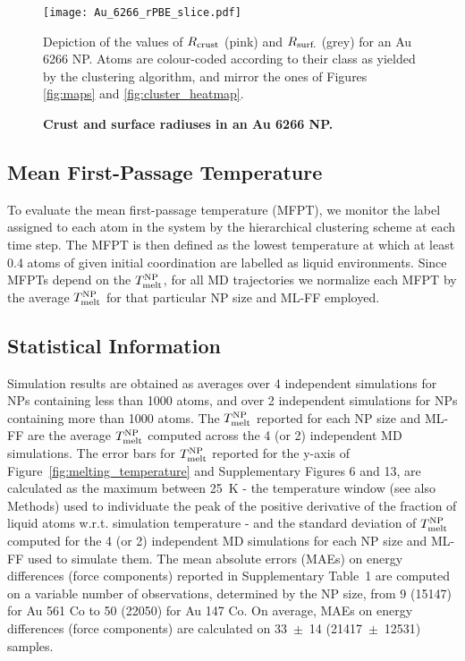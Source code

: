 \documentclass[%
aip,
 amsmath,amssymb,
 reprint,
]{revtex4-1}
\newcommand*\subt[1]{_{\textnormal{#1}}}
\newcommand*\supt[1]{^{\textnormal{#1}}}
\begin{document}
\begin{figure}[t!]
    \centering
    \texttt{[image: Au\_6266\_rPBE\_slice.pdf]}
    \caption{
    \textbf{Crust and surface radiuses in an Au 6266 NP.}}
    Depiction of the values of $R\subt{crust}$ (pink) and $R\subt{surf.}$ (grey) for an Au 6266 NP.
    Atoms are colour-coded according to their class as yielded by the clustering algorithm, and mirror the ones of Figures \ref{fig:maps} and \ref{fig:cluster_heatmap}.
    \label{fig:Au_slice}
\end{figure}



\subsection*{Mean First-Passage Temperature}
\label{subsubsec:mfpt}
%
To evaluate the mean first-passage temperature (MFPT), we monitor the label assigned to each atom in the system by the hierarchical clustering scheme at each time step.
%
The MFPT is then defined as the lowest temperature at which at least 0.4 atoms of given initial coordination are labelled as  liquid environments.
%
Since MFPTs depend on the $T\subt{melt}\supt{NP}$, for all MD trajectories we normalize each MFPT by the average $T\subt{melt}\supt{NP}$ for that particular NP size and ML-FF employed.
%

\subsection*{Statistical Information}
\label{subsec:statistical_info}
%
Simulation results are obtained as averages over 4 independent simulations for NPs containing less than 1000 atoms, and over 2 independent simulations for NPs containing more than 1000 atoms.
%
The $T\subt{melt}\supt{NP}$ reported for each NP size and ML-FF are the average $T\subt{melt}\supt{NP}$ computed across the 4 (or 2) independent MD simulations.
%
The error bars for $T\subt{melt}\supt{NP}$ reported for the y-axis of Figure~\ref{fig:melting_temperature} and Supplementary Figures 6 and 13, are calculated as the maximum between 25~K - the temperature window (see also Methods) used to individuate the peak of the positive derivative of the fraction of liquid atoms w.r.t. simulation temperature - and the standard deviation of $T\subt{melt}\supt{NP}$ computed for the 4 (or 2) independent MD simulations for each NP size and ML-FF used to simulate them.
%
The mean absolute errors (MAEs) on energy differences (force components) reported in Supplementary Table~1 are computed on a variable number of observations, determined by the NP size, from 9 (15147) for Au 561 Co to 50 (22050) for Au 147 Co.
%
On average, MAEs on energy differences (force components) are calculated on 33~$\pm$~14 (21417~$\pm$~12531) samples.
%
\end{document}

